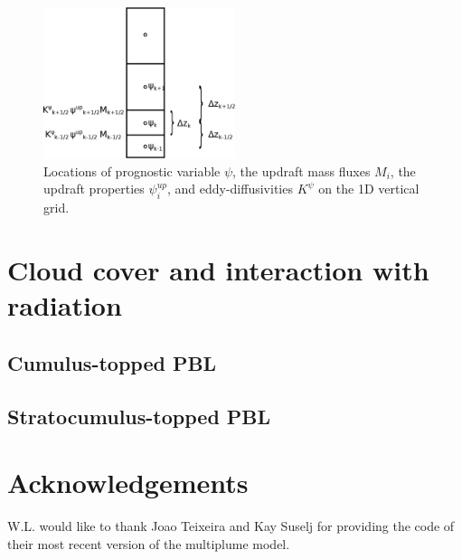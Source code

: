 \documentclass[dvipdfmx,a4paper,10pt]{article}
\begin{document}
 

\begin{figure}[bthp]
\centering
 \includegraphics[width=0.5\textwidth]{staggering.eps}
\caption{Locations of prognostic variable $\psi$, the updraft mass fluxes $M_i$, the updraft properties $\psi^{up}_i$, and eddy-diffusivities $K^{\psi}$ on the 1D vertical grid. } \label{fig:staggering}
\end{figure}



\section{Cloud cover and interaction with radiation}\label{sec:clouds}

\subsection{Cumulus-topped PBL}

\subsection{Stratocumulus-topped PBL}



\section{Acknowledgements}
W.L. would like to thank Joao Teixeira and Kay Suselj for providing the code of their most recent version of the multiplume model. 



%


 
\end{document}
